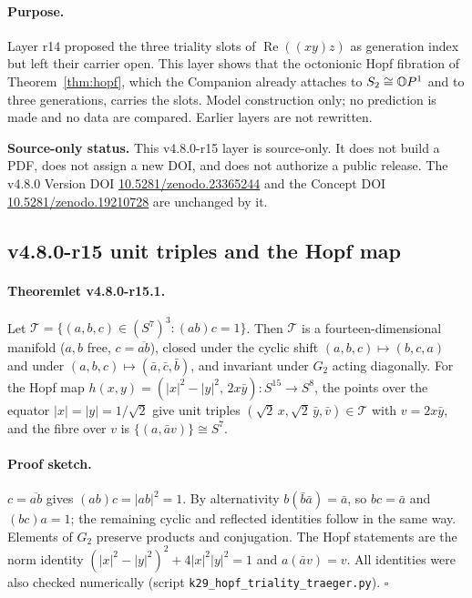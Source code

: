 \paragraph{Purpose.}
Layer r14 proposed the three triality slots of \(\operatorname{Re}((xy)z)\) as generation index but left their
carrier open.  This layer shows that the octonionic Hopf fibration of Theorem~\ref{thm:hopf}, which the Companion
already attaches to \(S_2\cong\mathbb{O} P^1\) and to three generations, carries the slots.  Model construction only; no
prediction is made and no data are compared.  Earlier layers are not rewritten.

\noindent\textbf{Source-only status.}
This v4.8.0-r15 layer is source-only.  It does not build a PDF, does not assign a new DOI,
and does not authorize a public release.  The v4.8.0 Version DOI
\href{https://doi.org/10.5281/zenodo.23365244}{10.5281/zenodo.23365244} and the Concept DOI
\href{https://doi.org/10.5281/zenodo.19210728}{10.5281/zenodo.19210728} are unchanged by it.

\subsection*{v4.8.0-r15 unit triples and the Hopf map}
\label{subsec:v480-r15-triples}

\paragraph{Theoremlet v4.8.0-r15.1.}
Let \(\mathcal T=\{(a,b,c)\in(S^7)^3:(ab)c=1\}\).  Then \(\mathcal T\) is a fourteen-dimensional manifold
(\(a,b\) free, \(c=\overline{ab}\)), closed under the cyclic shift \((a,b,c)\mapsto(b,c,a)\) and under
\((a,b,c)\mapsto(\bar a,\bar c,\bar b)\), and invariant under \(G_2\) acting diagonally.  For the Hopf map
\(h(x,y)=(|x|^2-|y|^2,\,2x\bar y)\colon S^{15}\to S^8\), the points over the equator \(|x|=|y|=1/\sqrt2\) give
unit triples \((\sqrt2\,x,\sqrt2\,\bar y,\bar v)\in\mathcal T\) with \(v=2x\bar y\), and the fibre over \(v\) is
\(\{(a,\bar a v)\}\cong S^7\).

\paragraph{Proof sketch.}
\(c=\overline{ab}\) gives \((ab)c=|ab|^2=1\).  By alternativity \(b(\bar b\bar a)=\bar a\), so \(bc=\bar a\) and
\((bc)a=1\); the remaining cyclic and reflected identities follow in the same way.  Elements of \(G_2\) preserve
products and conjugation.  The Hopf statements are the norm identity \((|x|^2-|y|^2)^2+4|x|^2|y|^2=1\) and
\(a(\bar a v)=v\).  All identities were also checked numerically (script \texttt{k29\_hopf\_triality\_traeger.py}).
\(\square\)

